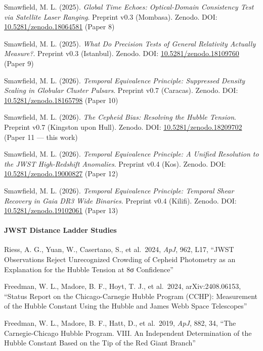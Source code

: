\documentclass[
]{article}
\begin{document}
Smawfield, M. L. (2025). \emph{Global Time Echoes: Optical-Domain
Consistency Test via Satellite Laser Ranging}. Preprint v0.3 (Mombasa).
Zenodo. DOI:
\href{https://doi.org/10.5281/zenodo.18064581}{10.5281/zenodo.18064581}
(Paper 8)

Smawfield, M. L. (2025). \emph{What Do Precision Tests of General
Relativity Actually Measure?}. Preprint v0.3 (Istanbul). Zenodo. DOI:
\href{https://doi.org/10.5281/zenodo.18109760}{10.5281/zenodo.18109760}
(Paper 9)

Smawfield, M. L. (2026). \emph{Temporal Equivalence Principle:
Suppressed Density Scaling in Globular Cluster Pulsars}. Preprint v0.7
(Caracas). Zenodo. DOI:
\href{https://doi.org/10.5281/zenodo.18165798}{10.5281/zenodo.18165798}
(Paper 10)

Smawfield, M. L. (2026). \emph{The Cepheid Bias: Resolving the Hubble
Tension}. Preprint v0.7 (Kingston upon Hull). Zenodo. DOI:
\href{https://doi.org/10.5281/zenodo.18209702}{10.5281/zenodo.18209702}
(Paper 11 --- this work)

Smawfield, M. L. (2026). \emph{Temporal Equivalence Principle: A Unified
Resolution to the JWST High-Redshift Anomalies}. Preprint v0.4 (Kos).
Zenodo. DOI:
\href{https://doi.org/10.5281/zenodo.19000827}{10.5281/zenodo.19000827}
(Paper 12)

Smawfield, M. L. (2026). \emph{Temporal Equivalence Principle: Temporal
Shear Recovery in Gaia DR3 Wide Binaries}. Preprint v0.4 (Kilifi).
Zenodo. DOI:
\href{https://doi.org/10.5281/zenodo.19102061}{10.5281/zenodo.19102061}
(Paper 13)

\paragraph{JWST Distance Ladder
Studies}\label{jwst-distance-ladder-studies}

Riess, A. G., Yuan, W., Casertano, S., et al.~2024, \emph{ApJ}, 962,
L17, ``JWST Observations Reject Unrecognized Crowding of Cepheid
Photometry as an Explanation for the Hubble Tension at 8σ Confidence''

Freedman, W. L., Madore, B. F., Hoyt, T. J., et al.~2024,
arXiv:2408.06153, ``Status Report on the Chicago-Carnegie Hubble Program
(CCHP): Measurement of the Hubble Constant Using the Hubble and James
Webb Space Telescopes''

Freedman, W. L., Madore, B. F., Hatt, D., et al.~2019, \emph{ApJ}, 882,
34, ``The Carnegie-Chicago Hubble Program. VIII. An Independent
Determination of the Hubble Constant Based on the Tip of the Red Giant
Branch''
\end{document}

